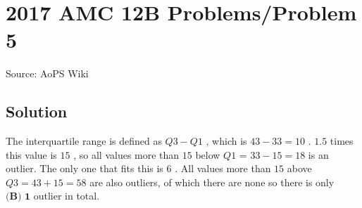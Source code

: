 \documentclass[12pt]{article}
\begin{document}
\section*{{2017 AMC 12B Problems/Problem 5}}
Source: AoPS Wiki

\subsection*{Solution}
The interquartile range is defined as $Q3 - Q1$ , which is $43 - 33 = 10$ . $1.5$ times this value is $15$ , so all values more than $15$ below $Q1$ = $33 - 15 = 18$ is an outlier. The only one that fits this is $6$ . All values more than $15$ above $Q3 = 43 + 15 = 58$ are also outliers, of which there are none so there is only $\boxed{\textbf{(B) 1}}$ outlier in total.
\end{document}
